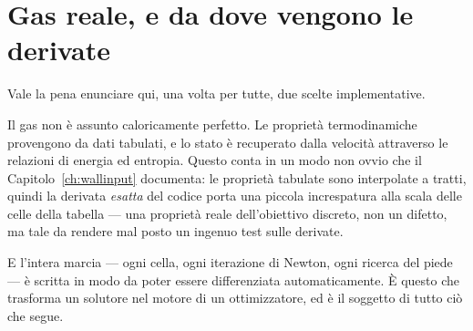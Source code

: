 \section{Gas reale, e da dove vengono le derivate}

Vale la pena enunciare qui, una volta per tutte, due scelte
implementative.

Il gas non è assunto caloricamente perfetto. Le proprietà
termodinamiche provengono da dati tabulati, e lo stato è recuperato
dalla velocità attraverso le relazioni di energia ed entropia.
Questo conta in un modo non ovvio che il
Capitolo~\ref{ch:wallinput} documenta: le proprietà tabulate sono
interpolate a tratti, quindi la derivata \emph{esatta} del codice
porta una piccola increspatura alla scala delle celle della tabella
--- una proprietà reale dell'obiettivo discreto, non un difetto, ma
tale da rendere mal posto un ingenuo test sulle derivate.

E l'intera marcia --- ogni cella, ogni iterazione di Newton, ogni
ricerca del piede --- è scritta in modo da poter essere
differenziata automaticamente. È questo che trasforma un solutore
nel motore di un ottimizzatore, ed è il soggetto di tutto ciò che
segue.
